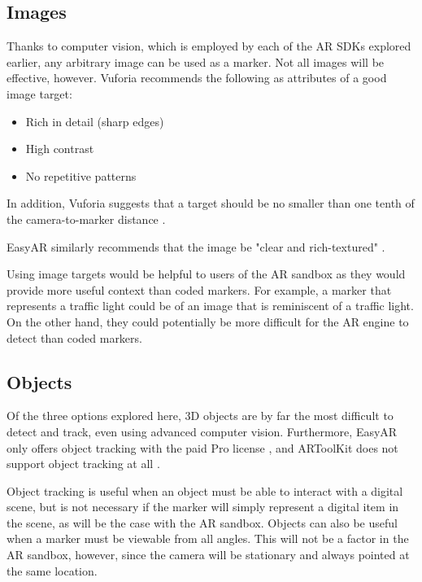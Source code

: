 \documentclass[letterpaper, 10pt, onecolumn, draftclsnofoot]{IEEEtran}
\begin{document}
\subsection{Images}
Thanks to computer vision, which is employed by each of the AR SDKs explored earlier, any arbitrary image can be used as a marker. Not all images will be effective, however. Vuforia recommends the following as attributes of a good image target:
\begin{itemize}
    \item Rich in detail (sharp edges)
    \item High contrast
    \item No repetitive patterns
\end{itemize}
In addition, Vuforia suggests that a target should be no smaller than one tenth of the camera-to-marker distance \cite{vuforia-images}.

EasyAR similarly recommends that the image be "clear and rich-textured" \cite{easyar-images}.

Using image targets would be helpful to users of the AR sandbox as they would provide more useful context than coded markers. For example, a marker that represents a traffic light could be of an image that is reminiscent of a traffic light. On the other hand, they could potentially be more difficult for the AR engine to detect than coded markers.

\subsection{Objects}
Of the three options explored here, 3D objects are by far the most difficult to detect and track, even using advanced computer vision. Furthermore, EasyAR only offers object tracking with the paid Pro license \cite{easyar-prices}, and ARToolKit does not support object tracking at all \cite{artoolkit-features}.

Object tracking is useful when an object must be able to interact with a digital scene, but is not necessary if the marker will simply represent a digital item in the scene, as will be the case with the AR sandbox. Objects can also be useful when a marker must be viewable from all angles. This will not be a factor in the AR sandbox, however, since the camera will be stationary and always pointed at the same location.
\end{document}
